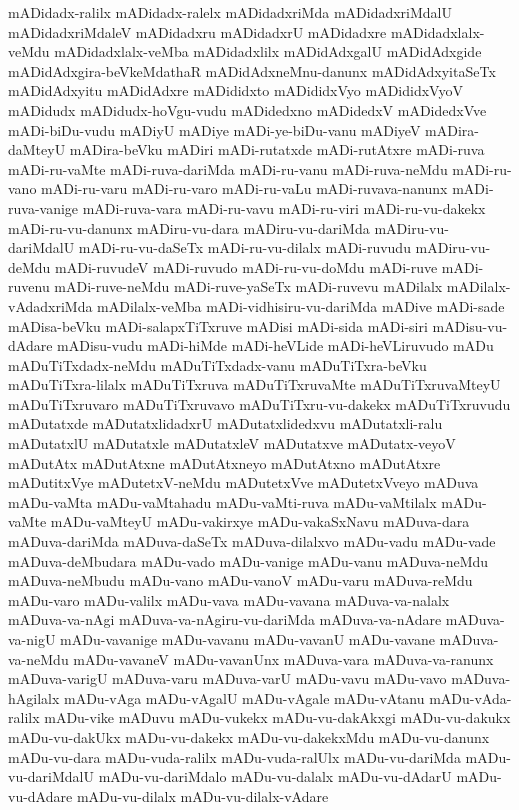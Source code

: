 {mADidadx-ralilx
mADidadx-ralelx
mADidadxriMda
mADidadxriMdalU
mADidadxriMdaleV
mADidadxru
mADidadxrU
mADidadxre
mADidadxlalx-veMdu
mADidadxlalx-veMba
mADidadxlilx
mADidAdxgalU
mADidAdxgide
mADidAdxgira-beVkeMdathaR
mADidAdxneMnu-danunx
mADidAdxyitaSeTx
mADidAdxyitu
mADidAdxre
mADididxto
mADididxVyo
mADididxVyoV
mADidudx
mADidudx-hoVgu-vudu
mADidedxno
mADidedxV
mADidedxVve
mADi-biDu-vudu
mADiyU
mADiye
mADi-ye-biDu-vanu
mADiyeV
mADira-daMteyU
mADira-beVku
mADiri
mADi-rutatxde
mADi-rutAtxre
mADi-ruva
mADi-ru-vaMte
mADi-ruva-dariMda
mADi-ru-vanu
mADi-ruva-neMdu
mADi-ru-vano
mADi-ru-varu
mADi-ru-varo
mADi-ru-vaLu
mADi-ruvava-nanunx
mADi-ruva-vanige
mADi-ruva-vara
mADi-ru-vavu
mADi-ru-viri
mADi-ru-vu-dakekx
mADi-ru-vu-danunx
mADiru-vu-dara
mADiru-vu-dariMda
mADiru-vu-dariMdalU
mADi-ru-vu-daSeTx
mADi-ru-vu-dilalx
mADi-ruvudu
mADiru-vu-deMdu
mADi-ruvudeV
mADi-ruvudo
mADi-ru-vu-doMdu
mADi-ruve
mADi-ruvenu
mADi-ruve-neMdu
mADi-ruve-yaSeTx
mADi-ruvevu
mADilalx
mADilalx-vAdadxriMda
mADilalx-veMba
mADi-vidhisiru-vu-dariMda
mADive
mADi-sade
mADisa-beVku
mADi-salapxTiTxruve
mADisi
mADi-sida
mADi-siri
mADisu-vu-dAdare
mADisu-vudu
mADi-hiMde
mADi-heVLide
mADi-heVLiruvudo
mADu
mADuTiTxdadx-neMdu
mADuTiTxdadx-vanu
mADuTiTxra-beVku
mADuTiTxra-lilalx
mADuTiTxruva
mADuTiTxruvaMte
mADuTiTxruvaMteyU
mADuTiTxruvaro
mADuTiTxruvavo
mADuTiTxru-vu-dakekx
mADuTiTxruvudu
mADutatxde
mADutatxlidadxrU
mADutatxlidedxvu
mADutatxli-ralu
mADutatxlU
mADutatxle
mADutatxleV
mADutatxve
mADutatx-veyoV
mADutAtx
mADutAtxne
mADutAtxneyo
mADutAtxno
mADutAtxre
mADutitxVye
mADutetxV-neMdu
mADutetxVve
mADutetxVveyo
mADuva
mADu-vaMta
mADu-vaMtahadu
mADu-vaMti-ruva
mADu-vaMtilalx
mADu-vaMte
mADu-vaMteyU
mADu-vakirxye
mADu-vakaSxNavu
mADuva-dara
mADuva-dariMda
mADuva-daSeTx
mADuva-dilalxvo
mADu-vadu
mADu-vade
mADuva-deMbudara
mADu-vado
mADu-vanige
mADu-vanu
mADuva-neMdu
mADuva-neMbudu
mADu-vano
mADu-vanoV
mADu-varu
mADuva-reMdu
mADu-varo
mADu-valilx
mADu-vava
mADu-vavana
mADuva-va-nalalx
mADuva-va-nAgi
mADuva-va-nAgiru-vu-dariMda
mADuva-va-nAdare
mADuva-va-nigU
mADu-vavanige
mADu-vavanu
mADu-vavanU
mADu-vavane
mADuva-va-neMdu
mADu-vavaneV
mADu-vavanUnx
mADuva-vara
mADuva-va-ranunx
mADuva-varigU
mADuva-varu
mADuva-varU
mADu-vavu
mADu-vavo
mADuva-hAgilalx
mADu-vAga
mADu-vAgalU
mADu-vAgale
mADu-vAtanu
mADu-vAda-ralilx
mADu-vike
mADuvu
mADu-vukekx
mADu-vu-dakAkxgi
mADu-vu-dakukx
mADu-vu-dakUkx
mADu-vu-dakekx
mADu-vu-dakekxMdu
mADu-vu-danunx
mADu-vu-dara
mADu-vuda-ralilx
mADu-vuda-ralUlx
mADu-vu-dariMda
mADu-vu-dariMdalU
mADu-vu-dariMdalo
mADu-vu-dalalx
mADu-vu-dAdarU
mADu-vu-dAdare
mADu-vu-dilalx
mADu-vu-dilalx-vAdare
}
